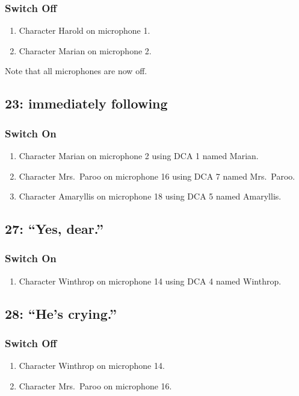 \subsubsection* {Switch Off}
\begin{enumerate}
\item Character Harold on microphone 1.
\item Character Marian on microphone 2.
\end{enumerate}
Note that all microphones are now off.
\subsection* {23: immediately following}
\subsubsection* {Switch On}
\begin{enumerate}
\item Character Marian on microphone 2 using DCA 1 named Marian.
\item Character Mrs.~Paroo on microphone 16 using DCA 7 named Mrs.~Paroo.
\item Character Amaryllis on microphone 18 using DCA 5 named Amaryllis.
\end{enumerate}
\subsection* {27: ``Yes, dear.''}
\subsubsection* {Switch On}
\begin{enumerate}
\item Character Winthrop on microphone 14 using DCA 4 named Winthrop.
\end{enumerate}
\subsection* {28: ``He's crying.''}
\subsubsection* {Switch Off}
\begin{enumerate}
\item Character Winthrop on microphone 14.
\item Character Mrs.~Paroo on microphone 16.
\end{enumerate}
